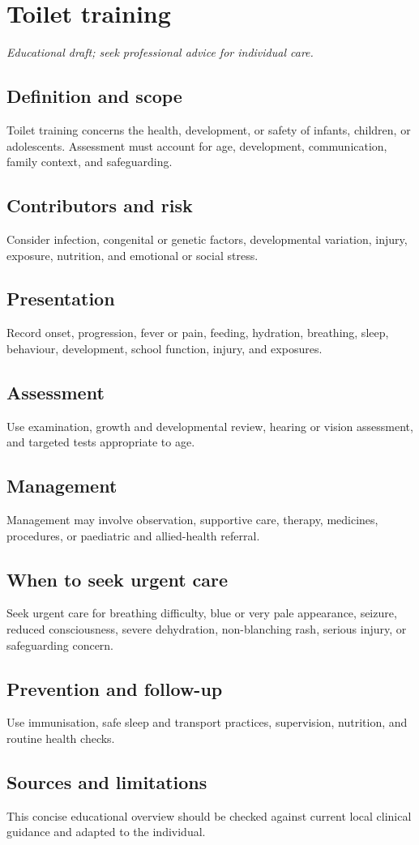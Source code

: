 \chapter{Toilet training}
\medskip
\noindent\textit{Educational draft; seek professional advice for individual care.}

\section*{Definition and scope}
Toilet training concerns the health, development, or safety of infants, children, or adolescents. Assessment must account for age, development, communication, family context, and safeguarding.

\section*{Contributors and risk}
Consider infection, congenital or genetic factors, developmental variation, injury, exposure, nutrition, and emotional or social stress.

\section*{Presentation}
Record onset, progression, fever or pain, feeding, hydration, breathing, sleep, behaviour, development, school function, injury, and exposures.

\section*{Assessment}
Use examination, growth and developmental review, hearing or vision assessment, and targeted tests appropriate to age.

\section*{Management}
Management may involve observation, supportive care, therapy, medicines, procedures, or paediatric and allied-health referral.

\section*{When to seek urgent care}
Seek urgent care for breathing difficulty, blue or very pale appearance, seizure, reduced consciousness, severe dehydration, non-blanching rash, serious injury, or safeguarding concern.

\section*{Prevention and follow-up}
Use immunisation, safe sleep and transport practices, supervision, nutrition, and routine health checks.

\section*{Sources and limitations}
This concise educational overview should be checked against current local clinical guidance and adapted to the individual.

